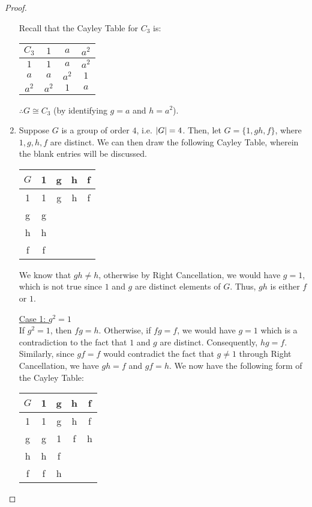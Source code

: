 \begin{proof}
\begin{enumerate}
      Recall that the Cayley Table for $C_3$ is:
      \begin{center}
        \begin{tabular}{c | c c c}
        $C_3$ & $1$   & $a$   & $a^2$ \\
        \hline
        $1$   & $1$   & $a$   & $a^2$ \\
        $a$   & $a$   & $a^2$ & $1$ \\
        $a^2$ & $a^2$ & $1$   & $a$
        \end{tabular}
      \end{center}
      $\therefore G \cong C_3$ (by identifying $g = a$ and $h = a^2$).

    \item Suppose $G$ is a group of order $4$, i.e. $\left|G\right| = 4$. Then, let $G = \{1, g h, f\}$, where $1, g, h, f$ are distinct. We can then draw the following Cayley Table, wherein the blank entries will be discussed.

          \begin{center}
            \begin{tabular}{c|c|c|c|c}
              $G$   & 1 & g & h & f \\
              \hline
              1     & 1 & g & h & f \\
              g     & g &   &   &   \\
              h     & h &   &   &   \\
              f     & f &   &   &  
            \end{tabular}
          \end{center}

          We know that $gh \neq h$, otherwise by Right Cancellation, we would have $g = 1$, which is not true since $1$ and $g$ are distinct elements of $G$. Thus, $gh$ is either $f$ or $1$.

          \underline{Case 1: $g^2 = 1$} \\
          If $g^2 = 1$, then $fg = h$. Otherwise, if $fg = f$, we would have $g = 1$ which is a contradiction to the fact that $1$ and $g$ are distinct. Consequently, $hg = f$. Similarly, since $gf = f$ would contradict the fact that $g \neq 1$ through Right Cancellation, we have $gh = f$ and $gf = h$. We now have the following form of the Cayley Table:
          \begin{center}
            \begin{tabular}{c|c|c|c|c}
              $G$   & 1 & g & h & f \\
              \hline
              1     & 1 & g & h & f \\
              g     & g & 1 & f & h \\
              h     & h & f &   &   \\
              f     & f & h &   &  
            \end{tabular}
          \end{center}


\end{enumerate}
\end{proof}
